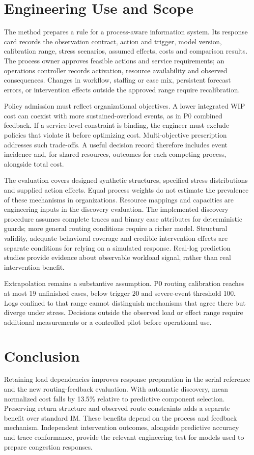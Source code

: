 \section{Engineering Use and Scope}
The method prepares a rule for a process-aware information system. Its response card records the observation contract, action and trigger, model version, calibration range, stress scenarios, assumed effects, costs and comparison results. The process owner approves feasible actions and service requirements; an operations controller records activation, resource availability and observed consequences. Changes in workflow, staffing or case mix, persistent forecast errors, or intervention effects outside the approved range require recalibration. 

Policy admission must reflect organizational objectives. A lower integrated WIP cost can coexist with more sustained-overload events, as in P0 combined feedback. If a service-level constraint is binding, the engineer must exclude policies that violate it before optimizing cost. Multi-objective prescription~\cite{multikpi} addresses such trade-offs. A useful decision record therefore includes event incidence and, for shared resources, outcomes for each competing process, alongside total cost.

The evaluation covers designed synthetic structures, specified stress distributions and supplied action effects. Equal process weights do not estimate the prevalence of these mechanisms in organizations. Resource mappings and capacities are engineering inputs in the discovery evaluation. The implemented discovery procedure assumes complete traces and binary case attributes for deterministic guards; more general routing conditions require a richer model. Structural validity, adequate behavioral coverage and credible intervention effects are separate conditions for relying on a simulated response. Real-log prediction studies provide evidence about observable workload signal, rather than real intervention benefit.

Extrapolation remains a substantive assumption. P0 routing calibration reaches at most 19 unfinished cases, below trigger 20 and severe-event threshold 100. Logs confined to that range cannot distinguish mechanisms that agree there but diverge under stress. Decisions outside the observed load or effect range require additional measurements or a controlled pilot before operational use.

\section{Conclusion}
Retaining load dependencies improves response preparation in the serial reference and the new routing-feedback evaluation. With automatic discovery, mean normalized cost falls by 13.5\% relative to predictive component selection. Preserving return structure and observed route constraints adds a separate benefit over standard IM. These benefits depend on the process and feedback mechanism. Independent intervention outcomes, alongside predictive accuracy and trace conformance, provide the relevant engineering test for models used to prepare congestion responses.

